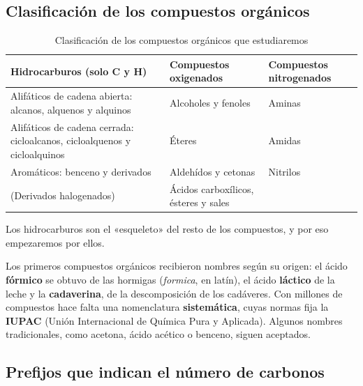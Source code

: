 \subsection{Clasificación de los compuestos orgánicos}

\begin{table}[H]
    \centering
    \caption{Clasificación de los compuestos orgánicos que estudiaremos}
    \vspace{-5pt}
    \begin{tabular}{@{}L{5cm}L{4.5cm}L{4.5cm}@{}}
        \toprule
        \textbf{Hidrocarburos} (solo C y H) & \textbf{Compuestos oxigenados} & \textbf{Compuestos nitrogenados} \\
        \midrule
        Alifáticos de cadena abierta: alcanos, alquenos y alquinos & Alcoholes y fenoles & Aminas \\[3pt]
        Alifáticos de cadena cerrada: cicloalcanos, cicloalquenos y cicloalquinos & Éteres & Amidas \\[3pt]
        Aromáticos: benceno y derivados & Aldehídos y cetonas & Nitrilos \\[3pt]
        (Derivados halogenados) & Ácidos carboxílicos, ésteres y sales & \\
        \bottomrule
    \end{tabular}
    \label{tab:ud7-clasificacion}
\end{table}

Los hidrocarburos son el «esqueleto» del resto de los compuestos, y por eso empezaremos por ellos.

\begin{remark}
    Los primeros compuestos orgánicos recibieron nombres según su origen: el ácido \textbf{fórmico} se obtuvo de las hormigas
    (\emph{formica}, en latín), el ácido \textbf{láctico} de la leche y la \textbf{cadaverina}, de la descomposición de los
    cadáveres. Con millones de compuestos hace falta una nomenclatura \textbf{sistemática}, cuyas normas fija la \textbf{IUPAC}
    (Unión Internacional de Química Pura y Aplicada). Algunos nombres tradicionales, como acetona, ácido acético o benceno, siguen
    aceptados.
\end{remark}

\subsection{Prefijos que indican el número de carbonos}

